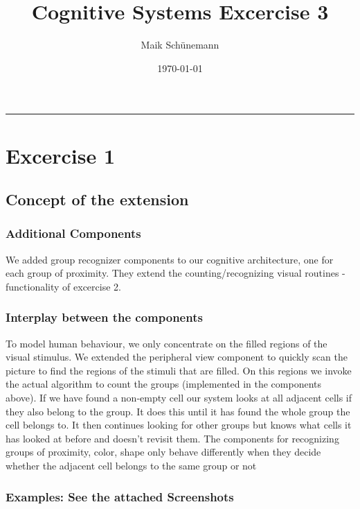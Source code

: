 \documentclass[11pt,a4paper,oneside]{scrartcl}
\author{Maik Schünemann}
\date{\today}
\title{Cognitive Systems Excercise 3}
\begin{document}
\maketitle
\tableofcontents


\rule{\linewidth}{0.5pt}
\section{Excercise 1}
\label{sec-1}

\subsection{Concept of the extension}
\label{sec-1-1}
\subsubsection{Additional Components}
\label{sec-1-1-1}
We added group recognizer components to our cognitive
architecture, one for each group of proximity.
They extend the counting/recognizing visual routines - 
functionality of excercise 2. 
\subsubsection{Interplay between the components}
\label{sec-1-1-2}
To model human behaviour, we only concentrate on the filled
regions of the visual stimulus. We extended the peripheral view
component to quickly scan the picture to find the regions of 
the stimuli that are filled. 
On this regions we invoke the actual algorithm to count the 
groups (implemented in the components above).
If we have found a non-empty cell our system looks at all adjacent
cells if they also belong to the group. It does this until it has
found the whole group the cell belongs to.
It then continues looking for other groups but knows what cells it
has looked at before and doesn't revisit them.
The components for recognizing groups of proximity, color, shape 
only behave differently when they decide whether the adjacent cell
belongs to the same group or not

\subsubsection{Examples: See the attached Screenshots}
\label{sec-1-1-3}
\end{document}
